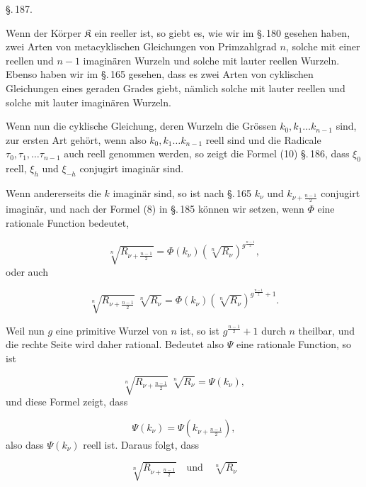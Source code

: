 \begin{center}
\S.\,187.

\end{center}

Wenn der Körper $\mathfrak{K}$ ein reeller ist, so giebt es, wie wir im §.\,180 gesehen haben, zwei Arten von metacyklischen Gleichungen von Primzahlgrad $n$, solche mit einer reellen und $n-1$ imaginären Wurzeln und solche mit lauter reellen Wurzeln. Ebenso haben wir im §.\,165 gesehen, dass es zwei Arten von cyklischen Gleichungen eines geraden Grades giebt, nämlich solche mit lauter reellen und solche mit lauter imaginären Wurzeln.

Wenn nun die cyklische Gleichung, deren Wurzeln die Grössen $k_0, k_1 \ldots k_{n-1}$ sind, zur ersten Art gehört, wenn also $k_0, k_1 \ldots k_{n-1}$ reell sind und die Radicale $\tau_0, \tau_1, \ldots \tau_{n-1}$ auch reell genommen werden, so zeigt die Formel (10) §.\,186, dass $\xi_0$ reell, $\xi_h$ und $\xi_{-h}$ conjugirt imaginär sind.

Wenn andererseits die $k$ imaginär sind, so ist nach §.\,165 $k_\nu$ und $k_{\nu+\frac{n-1}{2}}$ conjugirt imaginär, und nach der Formel (8) in §.\,185 können wir setzen, wenn $\Phi$ eine rationale Function bedeutet,

\[
\sqrt[n]{R_{\nu+\frac{n-1}{2}}} = \Phi(k_\nu) \left(\sqrt[n]{R_\nu}\right)^{g^{\frac{n-1}{2}}},
\]
oder auch

\[
\sqrt[n]{R_{\nu+\frac{n-1}{2}}}\ \sqrt[n]{R_\nu} = \Phi(k_\nu) \left(\sqrt[n]{R_\nu}\right)^{g^{\frac{n-1}{2}}+1}.
\]

Weil nun $g$ eine primitive Wurzel von $n$ ist, so ist $g^{\frac{n-1}{2}}+1$ durch $n$ theilbar, und die rechte Seite wird daher rational. Bedeutet also $\Psi$ eine rationale Function, so ist

\[
\sqrt[n]{R_{\nu+\frac{n-1}{2}}}\ \sqrt[n]{R_\nu} = \Psi(k_\nu),
\]
und diese Formel zeigt, dass

\[
\Psi(k_\nu) = \Psi\!\left(k_{\nu+\frac{n-1}{2}}\right),
\]
also dass $\Psi(k_\nu)$ reell ist. Daraus folgt, dass

\[
\sqrt[n]{R_{\nu+\frac{n-1}{2}}} \quad \text{und} \quad \sqrt[n]{R_\nu}
\]
